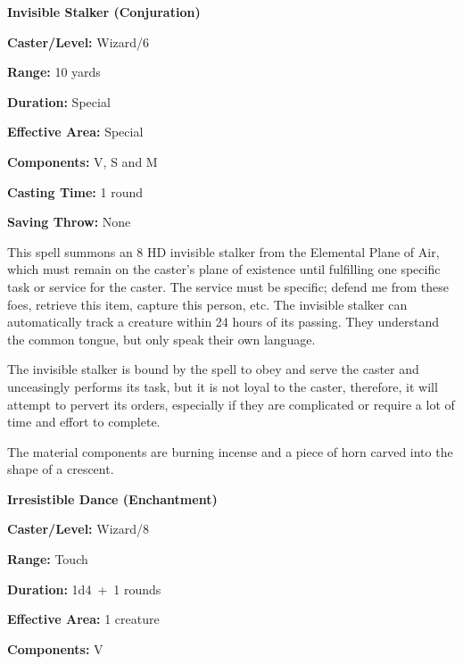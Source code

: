 \begin{multicols}{2}
\vspace{1em}

\noindent
\begin{minipage}{\columnwidth}

\noindent \textbf{Invisible Stalker (Conjuration)}

\noindent \textbf{Caster/Level:} Wizard/6

\noindent \textbf{Range:} 10 yards

\noindent \textbf{Duration:} Special

\noindent \textbf{Effective Area:} Special

\noindent \textbf{Components:} V, S and M

\noindent \textbf{Casting Time:} 1 round

\noindent \textbf{Saving Throw:} None

\end{minipage}

This spell summons an 8 HD invisible stalker from the Elemental Plane of Air, which must remain on the caster's plane of existence until fulfilling one specific task or service for the caster.  The service must be specific; defend me from these foes, retrieve this item, capture this person, etc.  The invisible stalker can automatically track a creature within 24 hours of its passing.  They understand the common tongue, but only speak their own language.

The invisible stalker is bound by the spell to obey and serve the caster and unceasingly performs its task, but it is not loyal to the caster, therefore, it will attempt to pervert its orders, especially if they are complicated or require a lot of time and effort to complete.  

The material components are burning incense and a piece of horn carved into the shape of a crescent.

\vspace{1em}

\noindent
\begin{minipage}{\columnwidth}

\noindent \textbf{Irresistible Dance (Enchantment)}

\noindent \textbf{Caster/Level:} Wizard/8

\noindent \textbf{Range:} Touch

\noindent \textbf{Duration:} 1d4~+~1 rounds

\noindent \textbf{Effective Area:} 1 creature

\noindent \textbf{Components:} V


\end{minipage}
\end{multicols}
